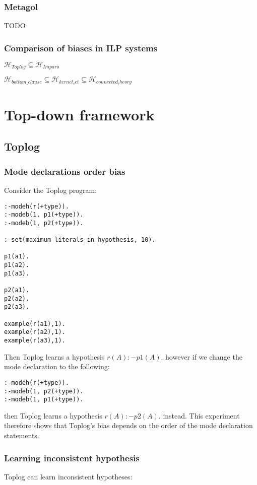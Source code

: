 \subsection{Metagol}
TODO


\subsection{Comparison of biases in ILP systems}
$\mathcal{H}_{Toplog} \subseteq \mathcal{H}_{Imparo}$

$\mathcal{H}_{bottom\_clause} \subseteq \mathcal{H}_{kernel_set} \subseteq \mathcal{H}_{connected_theory}$

\chapter{Top-down framework}

\section{Toplog}
\subsection{Mode declarations order bias}
Consider the Toplog program:
\begin{lstlisting}
:-modeh(r(+type)).
:-modeb(1, p1(+type)).
:-modeb(1, p2(+type)).

:-set(maximum_literals_in_hypothesis, 10).

p1(a1).
p1(a2).
p1(a3).

p2(a1).
p2(a2).
p2(a3).

example(r(a1),1).
example(r(a2),1).
example(r(a3),1).
\end{lstlisting}

Then Toplog learns a hypothesis $r(A) :- p1(A).$ however if we change the mode declaration to the following:
\begin{lstlisting}
:-modeh(r(+type)).
:-modeb(1, p2(+type)).
:-modeb(1, p1(+type)).
\end{lstlisting}
then Toplog learns a hypothesis $r(A) :- p2(A).$ instead. This experiment therefore shows that Toplog's bias depends on the order of the mode declaration statements.

\subsection{Learning inconsistent hypothesis}
Toplog can learn inconsistent hypotheses:

